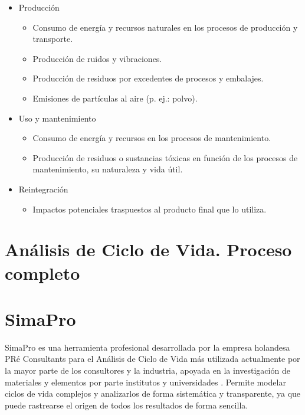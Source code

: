 \begin{itemize}
  \item Producción
    \begin{itemize}
     \item Consumo de energía y recursos naturales en los procesos de producción y transporte.
     \item Producción de ruidos y vibraciones.
     \item Producción de residuos por excedentes de procesos y embalajes.
     \item Emisiones de partículas al aire (p. ej.: polvo).
    \end{itemize}
  \item Uso y mantenimiento
    \begin{itemize}
      \item Consumo de energía y recursos en los procesos de mantenimiento.
      \item Producción de residuos o sustancias tóxicas en función de los procesos de mantenimiento, su naturaleza y vida útil.
    \end{itemize}
  \item Reintegración
    \begin{itemize}
      \item Impactos potenciales traspuestos al producto final que lo utiliza.
    \end{itemize}
\end{itemize}

\section{Análisis de Ciclo de Vida. Proceso completo}

\section{SimaPro}
SimaPro es una herramienta profesional desarrollada por la empresa holandesa PRé Consultants para el Análisis de Ciclo de Vida más utilizada actualmente por la mayor parte de los consultores y la industria, apoyada en la investigación de materiales y elementos por parte institutos y universidades \cite{mgoedkoop}. Permite modelar ciclos de vida complejos y analizarlos de forma sistemática y transparente, ya que puede rastrearse el origen de todos los resultados de forma sencilla.

